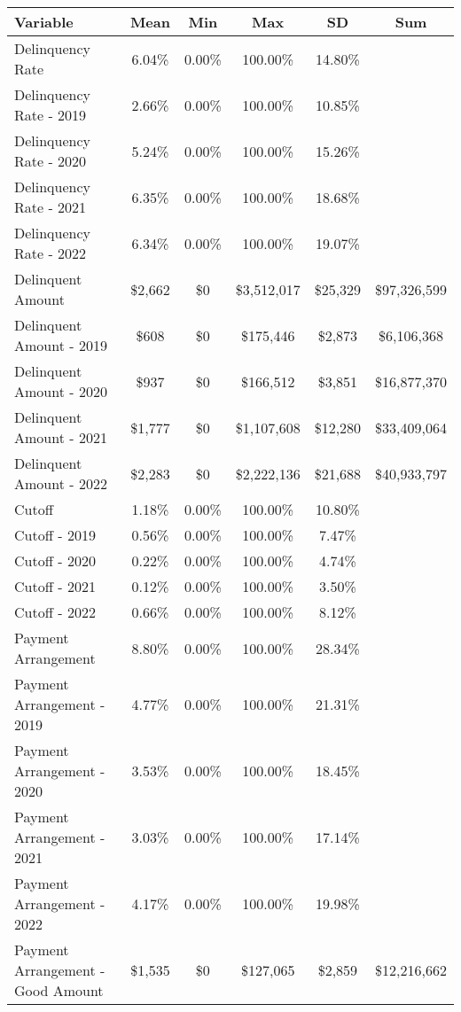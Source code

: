 \begin{tabular}{l|c|c|c|c|c}
\toprule 
\midrule 
Variable & Mean & Min & Max & SD & Sum \\
\midrule 
Delinquency Rate & 6.04\% & 0.00\% & 100.00\% & 14.80\% \\
\quad Delinquency Rate - 2019 & 2.66\% & 0.00\% & 100.00\% & 10.85\% \\
\quad Delinquency Rate - 2020 & 5.24\% & 0.00\% & 100.00\% & 15.26\% \\
\quad Delinquency Rate - 2021 & 6.35\% & 0.00\% & 100.00\% & 18.68\% \\
\quad Delinquency Rate - 2022 & 6.34\% & 0.00\% & 100.00\% & 19.07\% \\
\midrule 
Delinquent Amount & \$2,662 & \$0 & \$3,512,017 & \$25,329 & \$97,326,599 \\
\quad Delinquent Amount - 2019 & \$608 & \$0 & \$175,446 & \$2,873 & \$6,106,368 \\
\quad Delinquent Amount - 2020 & \$937 & \$0 & \$166,512 & \$3,851 & \$16,877,370 \\
\quad Delinquent Amount - 2021 & \$1,777 & \$0 & \$1,107,608 & \$12,280 & \$33,409,064 \\
\quad Delinquent Amount - 2022 & \$2,283 & \$0 & \$2,222,136 & \$21,688 & \$40,933,797 \\
\midrule 
Cutoff & 1.18\% & 0.00\% & 100.00\% & 10.80\% \\
\quad Cutoff - 2019 & 0.56\% & 0.00\% & 100.00\% & 7.47\% \\
\quad Cutoff - 2020 & 0.22\% & 0.00\% & 100.00\% & 4.74\% \\
\quad Cutoff - 2021 & 0.12\% & 0.00\% & 100.00\% & 3.50\% \\
\quad Cutoff - 2022 & 0.66\% & 0.00\% & 100.00\% & 8.12\% \\
\midrule 
Payment Arrangement & 8.80\% & 0.00\% & 100.00\% & 28.34\% \\
\quad Payment Arrangement - 2019 & 4.77\% & 0.00\% & 100.00\% & 21.31\% \\
\quad Payment Arrangement - 2020 & 3.53\% & 0.00\% & 100.00\% & 18.45\% \\
\quad Payment Arrangement - 2021 & 3.03\% & 0.00\% & 100.00\% & 17.14\% \\
\quad Payment Arrangement - 2022 & 4.17\% & 0.00\% & 100.00\% & 19.98\% \\
\quad Payment Arrangement - Good Amount & \$1,535 & \$0 & \$127,065 & \$2,859 & \$12,216,662 \\

\end{tabular}
